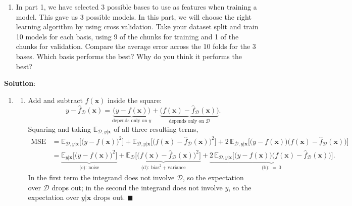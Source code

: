 \documentclass[submit]{../harvardml}
\newenvironment{solution}{
    \vspace{2mm}
    \color{blue}\noindent\textbf{Solution}:
}{}
\begin{document}
\begin{problem}
\begin{enumerate}
      \item In part 1, we have selected 3 possible bases to use as features when training a model. This gave us 3 possible models. In this part, we will choose the right learning algorithm by using cross validation. Take your dataset split and train 10 models for each basis, using 9 of the chunks for training and 1 of the chunks for validation. Compare the average error across the 10 folds for the 3 bases. Which basis performs the best? Why do you think it performs the best?


  \end{enumerate}
\end{problem}

\newpage

\begin{solution}
\begin{enumerate}

\item
\begin{enumerate}

\item
Add and subtract $f(\mathbf x)$ inside the square:
\[
  y - \hat f_{\mathcal D}(\mathbf x)
  = \underbrace{\big(y - f(\mathbf x)\big)}_{\text{depends only on }y}
  + \underbrace{\big(f(\mathbf x) - \hat f_{\mathcal D}(\mathbf x)\big)}_{\text{depends only on }\mathcal D}.
\]
Squaring and taking $\mathbb E_{\mathcal D, y|\mathbf x}$ of all three resulting terms,
\begin{align*}
  \text{MSE}
  &= \mathbb E_{\mathcal D, y|\mathbf x}\Big[\big(y-f(\mathbf x)\big)^2\Big]
   + \mathbb E_{\mathcal D, y|\mathbf x}\Big[\big(f(\mathbf x)-\hat f_{\mathcal D}(\mathbf x)\big)^2\Big]
   + 2\,\mathbb E_{\mathcal D, y|\mathbf x}\Big[\big(y-f(\mathbf x)\big)\big(f(\mathbf x)-\hat f_{\mathcal D}(\mathbf x)\big)\Big] \\[2pt]
  &= \underbrace{\mathbb E_{y|\mathbf x}\Big[\big(y-f(\mathbf x)\big)^2\Big]}_{\text{(c): noise}}
   + \underbrace{\mathbb E_{\mathcal D}\Big[\big(f(\mathbf x)-\hat f_{\mathcal D}(\mathbf x)\big)^2\Big]}_{\text{(d): bias}^2+\text{variance}}
   + \underbrace{2\,\mathbb E_{\mathcal D, y|\mathbf x}\Big[\big(y-f(\mathbf x)\big)\big(f(\mathbf x)-\hat f_{\mathcal D}(\mathbf x)\big)\Big]}_{\text{(b): }=\,0} .
\end{align*}
In the first term the integrand does not involve $\mathcal D$, so the expectation over
$\mathcal D$ drops out; in the second the integrand does not involve $y$, so the
expectation over $y|\mathbf x$ drops out. $\blacksquare$


\end{enumerate}
\end{enumerate}
\end{solution}
\end{document}
